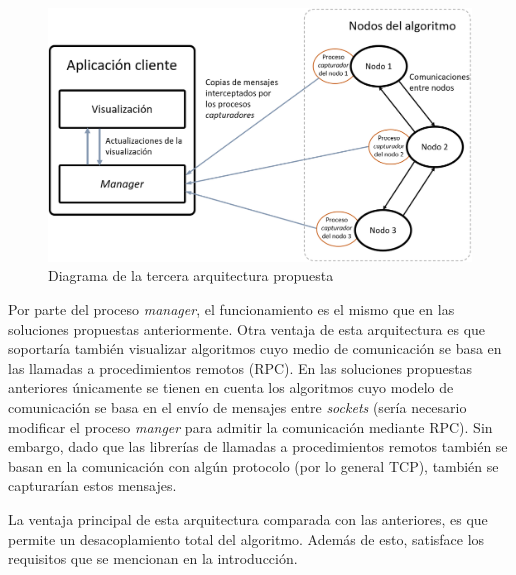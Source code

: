\begin{figure}[h]
  \centering
  \includegraphics[width=0.7\linewidth]{imagenes/arquitectura3}
  \caption{Diagrama de la tercera arquitectura propuesta}
  \label{fig:arquitectura3}
\end{figure}

Por parte del proceso \textit{manager}, el funcionamiento es el mismo que en las soluciones propuestas anteriormente. Otra ventaja de esta arquitectura es que soportaría también visualizar algoritmos cuyo medio de comunicación se basa en las llamadas a procedimientos remotos (RPC). En las soluciones propuestas anteriores únicamente se tienen en cuenta los algoritmos cuyo modelo de comunicación se basa en el envío de mensajes entre \textit{sockets} (sería necesario modificar el proceso \textit{manger} para admitir la comunicación mediante RPC). Sin embargo, dado que las librerías de llamadas a procedimientos remotos también se basan en la comunicación con algún protocolo (por lo general TCP), también se capturarían estos mensajes.

La ventaja principal de esta arquitectura comparada con las anteriores, es que permite un desacoplamiento total del algoritmo. Además de esto, satisface los requisitos que se mencionan en la introducción.

